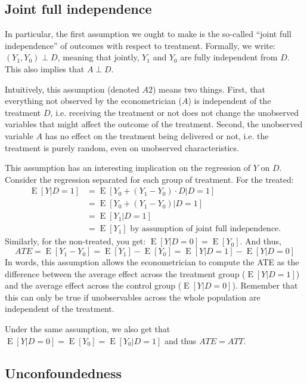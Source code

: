 \documentclass[12pt]{report}
\newcommand{\E}[1]{\operatorname{E}\left[#1\right]}
\begin{document}
\subsection{Joint full independence}

In particular, the first assumption we ought to make is the so-called ``joint full independence'' of outcomes with respect to treatment. Formally, we write: $(Y_1, Y_0)\perp D$, meaning that jointly, $Y_1$ and $Y_0$ are fully independent from $D$. This also implies that $A\perp D$.

Intuitively, this assumption (denoted $A2$) means two things. First, that everything not observed by the econometrician ($A$) is independent of the treatment $D$, i.e. receiving the treatment or not does not change the unobserved variables that might affect the outcome of the treatment. Second, the unobserved variable $A$ has no effect on the treatment being delivered or not, i.e. the treatment is purely random, even on unobserved characteristics.

This assumption has an interesting implication on the regression of $Y$ on $D$. Consider the regression separated for each group of treatment. For the treated: \begin{align*}
\E{Y\vert D =1} & = \E{Y_0 + (Y_1 - Y_0)\cdot D\vert D = 1} \\ & = \E{Y_0 + (Y_1 - Y_0) \vert D = 1}  \\ & = \E{Y_1 \vert D = 1}  \\ & = \E{Y_1} \text{ by assumption of joint full independence.}
\end{align*} Similarly, for the non-treated, you get: $\E{Y\vert D = 0} = \E{Y_0} $. And thus, $$ ATE = \E{Y_1 - Y_0} = \E{Y_1} - \E{Y_0} = \E{Y\vert D =1} - \E{Y\vert D = 0} $$ In words, this assumption allows the econometrician to compute the ATE as the difference between the average effect across the treatment group ($\E{Y\vert D =1}$) and the average effect across the control group ($\E{Y\vert D =0}$). Remember that this can only be true if unobservables across the whole population are independent of the treatment.

Under the same assumption, we also get that $\E{Y\vert D =0} = \E{Y_0} = \E{Y_0\vert D =1}$ and thus $ ATE = ATT$.

\subsection{Unconfoundedness}
\end{document}
